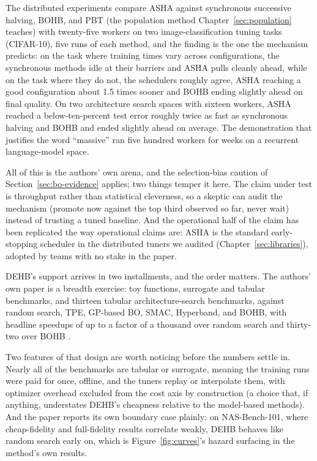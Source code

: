 The distributed
experiments compare ASHA against synchronous successive halving,
BOHB, and PBT (the population method Chapter~\ref{sec:population}
teaches) with twenty-five workers on two image-classification tuning
tasks (CIFAR-10),
five runs of each method, and the finding is the one the mechanism
predicts: on the task where training times vary across
configurations, the synchronous methods idle at their barriers and
ASHA pulls cleanly ahead, while on the task where they do not, the
schedulers roughly agree, ASHA reaching a good configuration about
1.5 times sooner and BOHB ending slightly ahead on final quality. On
two architecture search spaces with sixteen workers, ASHA reached a
below-ten-percent test error roughly twice as fast as synchronous
halving and BOHB and ended slightly ahead on average. The
demonstration that justifies the word ``massive'' ran five hundred
workers for weeks on a recurrent language-model space.

All of this is the authors' own
arena, and the selection-bias caution of
Section~\ref{sec:bo-evidence} applies; two things temper it here.
The claim under test is throughput rather than statistical
cleverness, so a skeptic can audit the mechanism (promote now
against the top third observed so far, never wait) instead of
trusting a tuned baseline. And the operational half of the claim has
been replicated the way operational claims are: ASHA is the standard
early-stopping scheduler in the distributed tuners we audited
(Chapter~\ref{sec:libraries}), adopted by teams with no stake in the
paper.

DEHB's support arrives in two installments, and the order matters.
The authors' own paper is a breadth exercise: toy functions,
surrogate and tabular benchmarks, and thirteen tabular
architecture-search benchmarks, against random search, TPE, GP-based
BO, SMAC, Hyperband, and BOHB, with headline speedups of up to a
factor of a thousand over random search and thirty-two over BOHB
\citep{awad2021dehb, falkner2018bohb}.

Two features of that design
are worth noticing before the numbers settle in. Nearly all of the
benchmarks are tabular or surrogate, meaning the training runs were
paid for once, offline, and the tuners replay or interpolate them,
with optimizer overhead excluded from the cost axis by construction
(a choice that, if anything, understates DEHB's cheapness relative
to the model-based methods). And the paper reports its own boundary
case plainly: on NAS-Bench-101, where cheap-fidelity and
full-fidelity results correlate weakly, DEHB behaves like random
search early on, which is Figure~\ref{fig:curves}'s hazard surfacing
in the method's own results.

